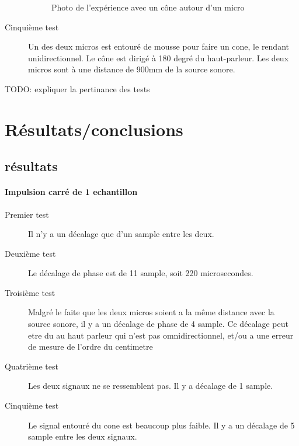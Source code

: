 \documentclass[12pt,a4paper]{report}
\begin{document}
\begin{description}
\begin{figure}[H]
	\caption{Photo de l'expérience avec un cône autour d'un micro}
	\end{figure}
\item[Cinquième test]	Un des deux micros est entouré de mousse pour faire un cone, le rendant unidirectionnel. Le cône est dirigé à 180 degré du haut-parleur. Les deux micros sont à une distance de 900mm de la source sonore.
\end{description}

\begin{huge}
TODO: expliquer la pertinance des tests
\end{huge}

\section{Résultats/conclusions}
\subsection{résultats}
\paragraph{Impulsion carré de 1 echantillon}
\begin{description}
\item[Premier test] Il n'y a un décalage que d'un sample entre les deux.
\item[Deuxième test] Le décalage de phase est de 11 sample, soit 220 microsecondes.
\item[Troisième test] Malgré le faite que les deux micros soient a la même distance avec la source sonore, il y a un décalage de phase de 4 sample. Ce décalage peut etre du au haut parleur qui n'est pas omnidirectionnel, et/ou a une erreur de mesure de l'ordre du centimetre
\item[Quatrième test] Les deux signaux ne se ressemblent pas. Il y a décalage de 1 sample.
\item[Cinquième test] Le signal entouré du cone est beaucoup plus faible. Il y a un décalage de 5 sample entre les deux signaux.
\end{description}
\end{document}
